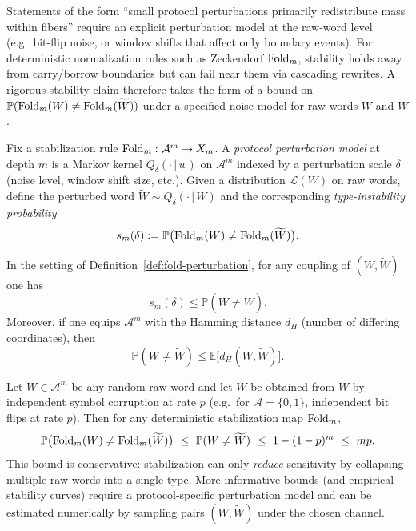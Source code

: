 \begin{remark}\label{rem:fold-stability}
Statements of the form ``small protocol perturbations primarily redistribute mass within fibers'' require an explicit perturbation model at the raw-word level (e.g.\ bit-flip noise, or window shifts that affect only boundary events). For deterministic normalization rules such as Zeckendorf $\mathrm{Fold}_m$, stability holds away from carry/borrow boundaries but can fail near them via cascading rewrites. A rigorous stability claim therefore takes the form of a bound on $\mathbb{P}(\mathrm{Fold}_m(W)\neq \mathrm{Fold}_m(\widetilde W))$ under a specified noise model for raw words $W$ and $\widetilde W$.
\end{remark}

\begin{definition}\label{def:fold-perturbation}
Fix a stabilization rule $\mathrm{Fold}_m:\mathcal{A}^m\to X_m$.
A \emph{protocol perturbation model} at depth $m$ is a Markov kernel $Q_\delta(\cdot\,|\,w)$ on $\mathcal{A}^m$ indexed by a perturbation scale $\delta$ (noise level, window shift size, etc.). Given a distribution $\mathcal{L}(W)$ on raw words, define the perturbed word $\widetilde W\sim Q_\delta(\cdot\,|\,W)$ and the corresponding \emph{type-instability probability}
\[
s_m(\delta):=\mathbb{P}\bigl(\mathrm{Fold}_m(W)\neq \mathrm{Fold}_m(\widetilde W)\bigr).
\]
\end{definition}

\begin{proposition}\label{prop:fold-instability-mismatch}
In the setting of Definition~\ref{def:fold-perturbation}, for any coupling of $(W,\widetilde W)$ one has
\[
s_m(\delta)\le \mathbb{P}(W\neq \widetilde W).
\]
Moreover, if one equips $\mathcal{A}^m$ with the Hamming distance $d_H$ (number of differing coordinates), then
\[
\mathbb{P}(W\neq \widetilde W)\le \mathbb{E}\bigl[d_H(W,\widetilde W)\bigr].
\]
\end{proposition}

\begin{proposition}\label{prop:fold-noise-bound}
Let $W\in\mathcal{A}^m$ be any random raw word and let $\widetilde W$ be obtained from $W$ by independent symbol corruption at rate $p$ (e.g.\ for $\mathcal{A}=\{0,1\}$, independent bit flips at rate $p$). Then for any deterministic stabilization map $\mathrm{Fold}_m$,
\[
\mathbb{P}\bigl(\Fold_m(W)\neq \Fold_m(\widetilde W)\bigr)\ \le\ \mathbb{P}(W\neq \widetilde W)\ \le\ 1-(1-p)^m\ \le\ mp.
\]
This bound is conservative: stabilization can only \emph{reduce} sensitivity by collapsing multiple raw words into a single type. More informative bounds (and empirical stability curves) require a protocol-specific perturbation model and can be estimated numerically by sampling pairs $(W,\widetilde W)$ under the chosen channel.
\end{proposition}


